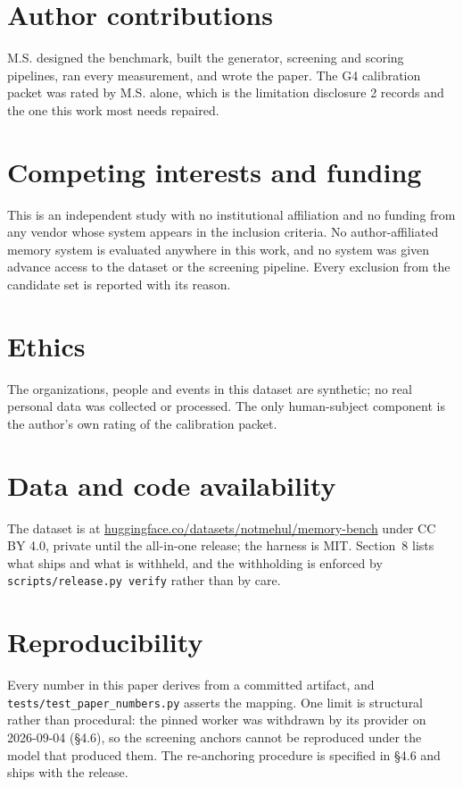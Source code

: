 \documentclass[11pt]{article}
\newcommand{\code}[1]{\texttt{\small #1}}
\begin{document}
\section*{Author contributions}

M.S. designed the benchmark, built the generator, screening and scoring
pipelines, ran every measurement, and wrote the paper. The G4 calibration packet
was rated by M.S. alone, which is the limitation disclosure 2 records and the one
this work most needs repaired.

\section*{Competing interests and funding}

This is an independent study with no institutional affiliation and no funding from
any vendor whose system appears in the inclusion criteria. No author-affiliated
memory system is evaluated anywhere in this work, and no system was given advance
access to the dataset or the screening pipeline. Every exclusion from the
candidate set is reported with its reason.

\section*{Ethics}

The organizations, people and events in this dataset are synthetic; no real
personal data was collected or processed. The only human-subject component is the
author's own rating of the calibration packet.

\section*{Data and code availability}

The dataset is at
\href{https://huggingface.co/datasets/notmehul/memory-bench}{huggingface.co/datasets/notmehul/memory-bench}
under CC BY 4.0, private until the all-in-one release; the harness is MIT.
Section~8 lists what ships and what is withheld, and the withholding is enforced
by \code{scripts/release.py verify} rather than by care.

\section*{Reproducibility}

Every number in this paper derives from a committed artifact, and
\code{tests/test\_paper\_numbers.py} asserts the mapping. One limit is structural
rather than procedural: the pinned worker was withdrawn by its provider on
2026-09-04 (\S4.6), so the screening anchors cannot be reproduced under the model
that produced them. The re-anchoring procedure is specified in \S4.6 and ships
with the release.
\end{document}

